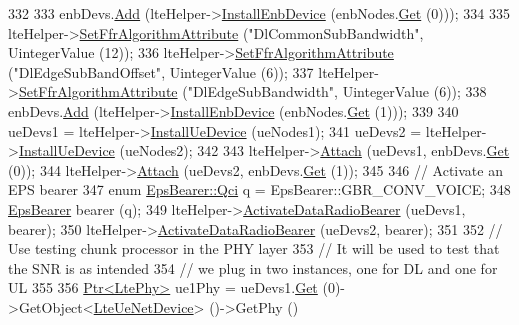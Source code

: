\begin{DoxyCode}
332 
333   enbDevs.\hyperlink{classns3_1_1NetDeviceContainer_a7ca8bc1d7ec00fd4fcc63869987fbda5}{Add} (lteHelper->\hyperlink{classns3_1_1LteHelper_a5e009ad35ef85f46b5a6099263f15a03}{InstallEnbDevice} (enbNodes.\hyperlink{classns3_1_1NodeContainer_a9ed96e2ecc22e0f5a3d4842eb9bf90bf}{Get} (0)));
334 
335   lteHelper->\hyperlink{classns3_1_1LteHelper_a793d56e843a844428851e90752c5f130}{SetFfrAlgorithmAttribute} (\textcolor{stringliteral}{"DlCommonSubBandwidth"}, UintegerValue (12));
336   lteHelper->\hyperlink{classns3_1_1LteHelper_a793d56e843a844428851e90752c5f130}{SetFfrAlgorithmAttribute} (\textcolor{stringliteral}{"DlEdgeSubBandOffset"}, UintegerValue (6));
337   lteHelper->\hyperlink{classns3_1_1LteHelper_a793d56e843a844428851e90752c5f130}{SetFfrAlgorithmAttribute} (\textcolor{stringliteral}{"DlEdgeSubBandwidth"}, UintegerValue (6));
338   enbDevs.\hyperlink{classns3_1_1NetDeviceContainer_a7ca8bc1d7ec00fd4fcc63869987fbda5}{Add} (lteHelper->\hyperlink{classns3_1_1LteHelper_a5e009ad35ef85f46b5a6099263f15a03}{InstallEnbDevice} (enbNodes.\hyperlink{classns3_1_1NodeContainer_a9ed96e2ecc22e0f5a3d4842eb9bf90bf}{Get} (1)));
339 
340   ueDevs1 = lteHelper->\hyperlink{classns3_1_1LteHelper_ac9cd932d7de92811cfa953c2e3b2fc9f}{InstallUeDevice} (ueNodes1);
341   ueDevs2 = lteHelper->\hyperlink{classns3_1_1LteHelper_ac9cd932d7de92811cfa953c2e3b2fc9f}{InstallUeDevice} (ueNodes2);
342 
343   lteHelper->\hyperlink{classns3_1_1LteHelper_a9466743f826aa2652a87907b7f0a1c87}{Attach} (ueDevs1, enbDevs.\hyperlink{classns3_1_1NetDeviceContainer_a677d62594b5c9d2dea155cc5045f4d0b}{Get} (0));
344   lteHelper->\hyperlink{classns3_1_1LteHelper_a9466743f826aa2652a87907b7f0a1c87}{Attach} (ueDevs2, enbDevs.\hyperlink{classns3_1_1NetDeviceContainer_a677d62594b5c9d2dea155cc5045f4d0b}{Get} (1));
345 
346   \textcolor{comment}{// Activate an EPS bearer}
347   \textcolor{keyword}{enum} \hyperlink{structns3_1_1EpsBearer_aecf0c67109c5eb4ec0b07226fff5885e}{EpsBearer::Qci} q = EpsBearer::GBR\_CONV\_VOICE;
348   \hyperlink{structns3_1_1EpsBearer}{EpsBearer} bearer (q);
349   lteHelper->\hyperlink{classns3_1_1LteHelper_ac896e16cf162e4beeaa292d39ab1b700}{ActivateDataRadioBearer} (ueDevs1, bearer);
350   lteHelper->\hyperlink{classns3_1_1LteHelper_ac896e16cf162e4beeaa292d39ab1b700}{ActivateDataRadioBearer} (ueDevs2, bearer);
351 
352   \textcolor{comment}{// Use testing chunk processor in the PHY layer}
353   \textcolor{comment}{// It will be used to test that the SNR is as intended}
354   \textcolor{comment}{// we plug in two instances, one for DL and one for UL}
355 
356   \hyperlink{classns3_1_1Ptr}{Ptr<LtePhy>} ue1Phy = ueDevs1.\hyperlink{classns3_1_1NetDeviceContainer_a677d62594b5c9d2dea155cc5045f4d0b}{Get} (0)->GetObject<\hyperlink{classns3_1_1LteUeNetDevice}{LteUeNetDevice}> ()->GetPhy ()

\end{DoxyCode}
